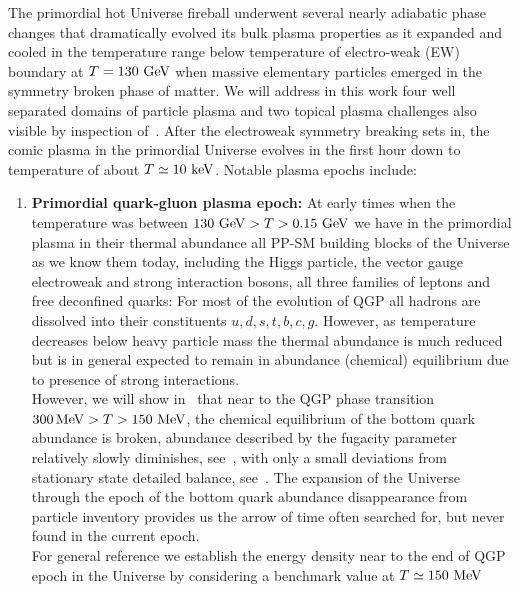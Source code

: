  
The primordial hot Universe fireball underwent several nearly adiabatic phase changes that dramatically evolved its bulk plasma properties as it expanded and cooled in the temperature range below temperature of electro-weak (EW) boundary at $T=130\text{ GeV}$ when massive elementary particles emerged in the symmetry broken phase of matter. We will address in this work four well separated domains of particle plasma and two topical plasma challenges also visible by inspection of~. After the electroweak symmetry breaking sets in, the comic plasma in the primordial Universe evolves in the first hour down to temperature of about $T\simeq 10\text{ keV}$. Notable plasma epochs include: 
\begin{enumerate}
\item \textbf{Primordial quark-gluon plasma epoch:} 
At early times when the temperature was between $130\text{ GeV}>T>0.15\text{ GeV}$ we have in the primordial plasma in their thermal abundance all PP-SM building blocks of the Universe as we know them today, including the Higgs particle, the vector gauge electroweak and strong interaction bosons, all three families of leptons and free deconfined quarks: For most of the evolution of QGP all hadrons are dissolved into their constituents $u,d,s,t,b,c,g$. However, as temperature decreases below heavy particle mass the thermal abundance is much reduced but is in general expected to remain in abundance (chemical) equilibrium due to presence of strong interactions. \\[0.2cm]
%
However, we will show in~ that near to the QGP phase transition $300\, \mathrm{MeV}>T>150\text{ MeV}$, the chemical equilibrium of the bottom quark abundance is broken, abundance described by the fugacity parameter relatively slowly diminishes, see~, with only a small deviations from stationary state detailed balance, see~. The expansion of the Universe through the epoch of the bottom quark abundance disappearance from particle inventory provides us the arrow of time often searched for, but never found in the current epoch.\\[0.2cm]
%
For general reference we establish the energy density near to the end of QGP epoch in the Universe by considering a benchmark value at $T\simeq 150\text{ MeV}$
\begin{equation} \label{endensval}

\end{equation}
\end{enumerate}
